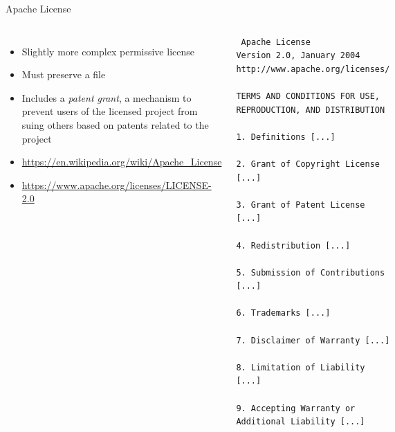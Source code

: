 \begin{frame}[fragile]{Apache License}
  \begin{columns}
    \begin{itemize}
    \item Slightly more complex permissive license
    \item Must preserve a  file
    \item Includes a {\em patent grant}, a mechanism to prevent users of
      the licensed project from suing others based on patents related to the
      project
    \item \url{https://en.wikipedia.org/wiki/Apache_License}
    \item \url{https://www.apache.org/licenses/LICENSE-2.0}
    \end{itemize}
    \begin{block}{}
      {\tiny
\begin{verbatim}
 Apache License
Version 2.0, January 2004
http://www.apache.org/licenses/

TERMS AND CONDITIONS FOR USE, REPRODUCTION, AND DISTRIBUTION

1. Definitions [...]

2. Grant of Copyright License [...]

3. Grant of Patent License [...]

4. Redistribution [...]

5. Submission of Contributions [...]

6. Trademarks [...]

7. Disclaimer of Warranty [...]

8. Limitation of Liability [...]

9. Accepting Warranty or Additional Liability [...]
\end{verbatim}
      }
    \end{block}
  \end{columns}
\end{frame}

